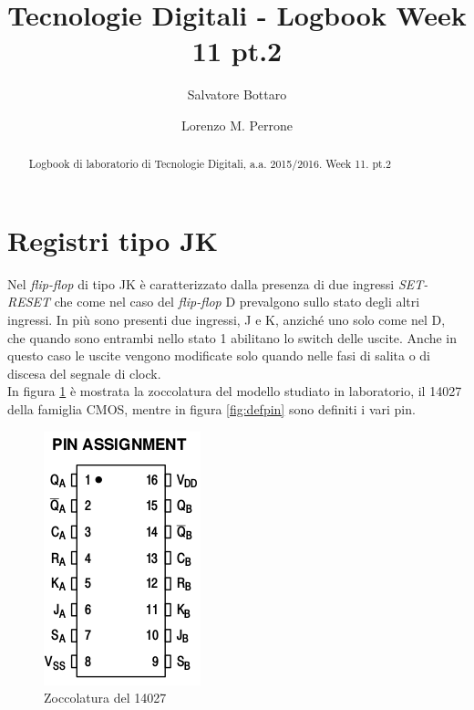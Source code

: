 \documentclass[journal, a4paper]{IEEEtran}
\begin{document}
	\title{Tecnologie Digitali - Logbook Week 11 pt.2}
	\author[1]{Salvatore Bottaro}
		\author[2]{Lorenzo M. Perrone}
	\maketitle
	
\begin{abstract}
	Logbook di laboratorio di Tecnologie Digitali, a.a. 2015/2016. Week 11. pt.2
\end{abstract}

\section{Registri tipo JK}

Nel \emph{flip-flop} di tipo JK è caratterizzato dalla presenza di due ingressi \emph{SET-RESET} che come nel caso del \emph{flip-flop} D prevalgono sullo stato degli altri ingressi. In più sono presenti due ingressi, J e K, anziché uno solo come nel D, che quando sono entrambi nello stato 1 abilitano lo switch delle uscite. Anche in questo caso le uscite vengono modificate solo quando nelle fasi di salita o di discesa del segnale di clock.\\
In figura \ref{fig:pin} è mostrata la zoccolatura del modello studiato in laboratorio, il 14027 della famiglia CMOS, mentre in figura \ref{fig:defpin} sono definiti i vari pin. 

\begin{figure}[htp]
\centering
\includegraphics[scale=.4]{pin}
\caption{Zoccolatura del 14027}
\label{fig:pin}
\end{figure}
\end{document}
